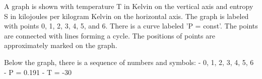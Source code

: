 A graph is shown with temperature T in Kelvin on the vertical axis and entropy S in kilojoules per kilogram Kelvin on the horizontal axis. The graph is labeled with points 0, 1, 2, 3, 4, 5, and 6. There is a curve labeled 'P = const'. The points are connected with lines forming a cycle. The positions of points are approximately marked on the graph.

Below the graph, there is a sequence of numbers and symbols:
- 0, 1, 2, 3, 4, 5, 6
- P = 0.191
- T = -30